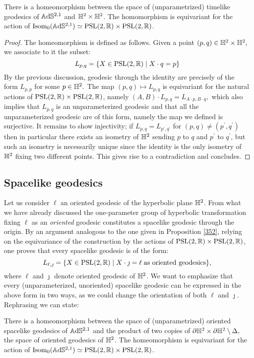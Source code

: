 \begin{proposition}\label{352}
    There is a homeomorphism between the space of (unparametrized) timelike geodesics of $\mathbb{A}\mathrm{d}\mathbb{S}^{2,1}$ and $\mathbb{H}^2\times\mathbb{H}^2$. The homomorphism is equivariant for the action of $\text{Isom}_{0} (\mathbb{A}\mathrm{d}\mathbb{S}^{2,1})\simeq \text{PSL}(2,\mathbb{R})\times\text{PSL}(2,\mathbb{R})$.
\end{proposition}
\begin{proof}
    The homeomorphism is defined as follows. Given a point $(p,q)\in \mathbb{H}^2\times\mathbb{H}^2,$ we associate to it the subset: 
    \[
        L_{p,q}=\{X\in\text{PSL}(2,\mathbb{R})\;|\;X\cdot q=p\}
    \]
    By the previous discussion, geodesic through the identity are precisely of the form $L_{p,p}$ for some $p\in\mathbb{H}^2.$ The map $(p,q)\mapsto L_{p,q}$ is equivariant for the natural actions of $\text{PSL}(2,\mathbb{R})\times \text{PSL}(2,\mathbb{R})$, namely $(A,B)\cdot L_{p,q}=L_{A\cdot p,B\cdot q},$ which also implies that $L_{p,q}$ is an unparameterized geodesic and that all the unparameterized geodesic are of this form, namely the map we defined is surjective. It remains to show injectivity; if $L_{p,q}=L_{p^{\prime} ,q^{\prime} }$ for $(p,q)\neq(p^{\prime},q^{\prime} )$ then in particular there exists an isometry of $\mathbb{H}^2$ sending $p$ to $q$ and $p^{\prime} $ to $q^{\prime}$, but such an isometry is necessarily unique since the identity is the only isometry of $\mathbb{H}^2$ fixing two different points. This gives rise to a contradiction and concludes.  
\end{proof}

\subsection{Spacelike geodesics}
Let us consider $\ell$ an oriented geodesic of the hyperbolic plane $\mathbb{H}^2$. From what we have already discussed the one-parameter group of hyperbolic transformation fixing $\ell$ as an \textit{oriented} geodesic constitutes a spacelike geodesic through the origin. By an argument analogous to the one given in Proposition \ref{352}, relying on the equivariance of the construction by the actions of $\text{PSL}(2,\mathbb{R})\times\text{PSL}(2,\mathbb{R})$, one proves that every spacelike geodesic is of the form: 
\[
    L_{\ell,\jmath}=\{X\in\text{PSL}(2,\mathbb{R})\;|\;X\cdot\jmath=\ell\;\text{as oriented geodesics}\},
\]
where $\ell$ and $\jmath$ denote oriented geodesic of $\mathbb{H}^2$. We want to emphasize that every (unparameterized, unoriented) spacelike geodesic can be expressed in the above form in two ways, as we could change the orientation of both $\ell$ and $\jmath$. Rephrasing we can state: 
\begin{proposition}\label{353}
    There is a homeomorphism between the space of (unparametrized) oriented spacelike geodesics of $\mathbb{A}\mathrm{d}\mathbb{S}^{2,1}$ and the product of two copies of $\partial\mathbb{H}^2\times\partial\mathbb{H}^2\setminus\Delta,$ the space of oriented geodesics of $\mathbb{H}^2$. The homeomorphism is equivariant for the action of $\text{Isom}_0(\mathbb{A}\mathrm{d}\mathbb{S}^{2,1})\simeq\text{PSL}(2,\mathbb{R})\times\text{PSL}(2,\mathbb{R})$.
\end{proposition}

